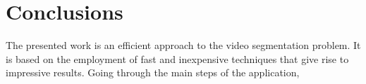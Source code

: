 \documentclass{usiinftr}
\begin{document}
\section{Conclusions}

The presented work is an efficient approach to the video segmentation problem. It is based on the employment of fast and inexpensive techniques that give rise to impressive results. 
Going through the main steps of the application, 

  
\end{document}
